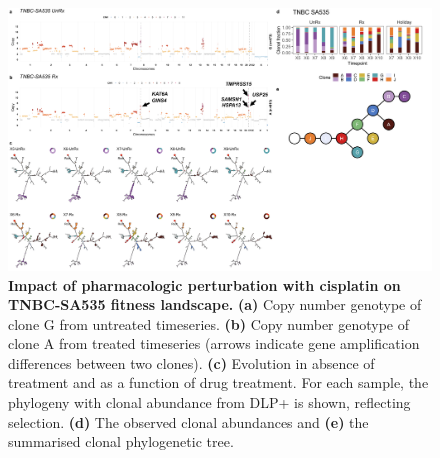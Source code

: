 \begin{figure}
\centering
\includegraphics[width=\textwidth]{Figures/chap4/genePlot535.png}
	
\caption[Impact of pharmacologic perturbation with cisplatin on TNBC-SA535 fitness landscape.]
	{\small
	\textbf{Impact of pharmacologic perturbation with cisplatin on TNBC-SA535 fitness landscape.}
	     \textbf{(a)} Copy number genotype of clone G from untreated timeseries. \textbf{(b)} Copy number genotype of clone A from treated timeseries (arrows indicate gene amplification differences between two clones).  \textbf{(c)}  Evolution in absence of treatment and as a function of drug treatment. For each sample, the phylogeny with clonal abundance from DLP+ is shown, reflecting selection. \textbf{(d)} The observed clonal abundances and \textbf{(e)} the summarised clonal phylogenetic tree.
	}
	\label{fig:genotype535cisplatin}
\end{figure}


